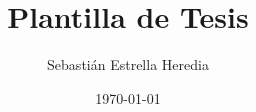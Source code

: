 \documentclass[12pt,oneside,a4paper]{book}
\begin{document}
\title{Plantilla de Tesis}
\author{Sebastián Estrella Heredia}
\date{\today}



\frontmatter






\tableofcontents

\mainmatter








\end{document}
